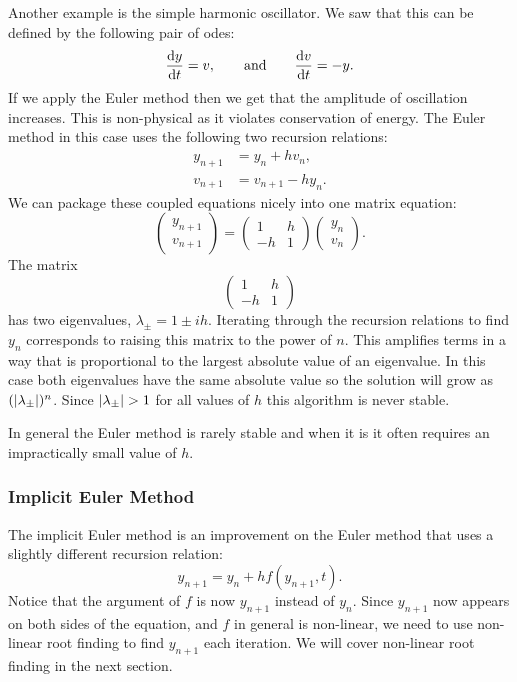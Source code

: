 \documentclass[a4paper]{article}
\begin{document}
    Another example is the simple harmonic oscillator.
    We saw that this can be defined by the following pair of \glspl{ode}:
    \[\dv{y}{t} = v,\qquad\text{and}\qquad \dv{v}{t} = -y.\]
    If we apply the Euler method then we get that the amplitude of oscillation increases.
    This is non-physical as it violates conservation of energy.
    The Euler method in this case uses the following two recursion relations:
    \begin{align*}
        y_{n+1} &= y_n + hv_n,\\
        v_{n+1} &= v_{n+1} - hy_n.
    \end{align*}
    We can package these coupled equations nicely into one matrix equation:
    \[
        \begin{pmatrix}
            y_{n+1}\\ v_{n+1}
        \end{pmatrix}
        =
        \begin{pmatrix}
            1 & h\\
            -h & 1
        \end{pmatrix}
        \begin{pmatrix}
            y_n\\ v_n
        \end{pmatrix}
        .
    \]
    The matrix
    \[
        \begin{pmatrix}
            1 & h\\
            -h & 1
        \end{pmatrix}
    \]
    has two eigenvalues, \(\lambda_{\pm} = 1 \pm ih\).
    Iterating through the recursion relations to find \(y_n\) corresponds to raising this matrix to the power of \(n\).
    This amplifies terms in a way that is proportional to the largest absolute value of an eigenvalue.
    In this case both eigenvalues have the same absolute value so the solution will grow as \((\abs{\lambda_{\pm}})^n\).
    Since \(\abs{\lambda_{\pm}} > 1\) for all values of \(h\) this algorithm is never stable.
    
    In general the Euler method is rarely stable and when it is it often requires an impractically small value of \(h\).
    
    \subsubsection{Implicit Euler Method}
    The implicit Euler method is an improvement on the Euler method that uses a slightly different recursion relation:
    \[y_{n+1} = y_n + hf(y_{n+1}, t).\]
    Notice that the argument of \(f\) is now \(y_{n+1}\) instead of \(y_n\).
    Since \(y_{n+1}\) now appears on both sides of the equation, and \(f\) in general is non-linear, we need to use non-linear root finding to find \(y_{n+1}\) each iteration.
    We will cover non-linear root finding in the next section.
    
\end{document}
